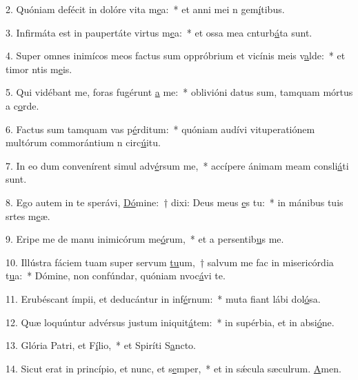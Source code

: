 2. Quóniam defécit in dolóre vita m\uline{e}a:~* et anni mei n gem\uline{í}tibus.\par 
3. Infirmáta est in paupertáte virtus m\uline{e}a:~* et ossa mea cnturb\uline{á}ta sunt.\par 
4. Super omnes inimícos meos factus sum oppróbrium et vicínis meis v\uline{a}lde:~* et timor ntis m\uline{e}is.\par 
5. Qui vidébant me, foras fugérunt \uline{a} me:~* oblivióni datus sum, tamquam mórtus a c\uline{o}rde.\par 
6. Factus sum tamquam vas p\uline{é}rditum:~* quóniam audívi vituperatiónem multórum commorántium n circ\uline{ú}itu.\par 
7. In eo dum convenírent simul adv\uline{é}rsum me,~* accípere ánimam meam consli\uline{á}ti sunt.\par 
8. Ego autem in te sperávi, \uline{Dó}mine:~† dixi: Deus meus \uline{e}s tu:~* in mánibus tuis srtes m\uline{e}æ.\par 
9. Eripe me de manu inimicórum me\uline{ó}rum,~* et a persentib\uline{u}s me.\par 
10. Illústra fáciem tuam super servum \uline{tu}um,~† salvum me fac in misericórdia t\uline{u}a:~* Dómine, non confúndar, quóniam nvoc\uline{á}vi te.\par 
11. Erubéscant ímpii, et deducántur in inf\uline{é}rnum:~* muta fiant lábi dol\uline{ó}sa.\par 
12. Quæ loquúntur advérsus justum iniquit\uline{á}tem:~* in supérbia, et in absi\uline{ó}ne.\par 
13. Glória Patri, et F\uline{í}lio,~* et Spiríti S\uline{a}ncto.\par 
14. Sicut erat in princípio, et nunc, et s\uline{e}mper,~* et in sǽcula sæculrum. \uline{A}men.\par 

